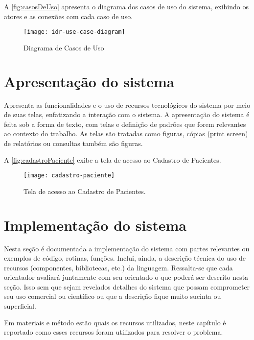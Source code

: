 A \autoref{fig:casosDeUso} apresenta o diagrama dos casos de uso do sistema, exibindo os atores e as conexões com cada caso de uso.

\begin{figure}[htpb]
  \captionsetup{width=0.5\textwidth}
  \caption{Diagrama de Casos de Uso}
  \label{fig:casosDeUso}
  \texttt{[image: idr-use-case-diagram]}
  \fonte{}
\end{figure}

\section{Apresentação do sistema}\label{sec:apresentacaoSistema}

Apresenta as funcionalidades e o uso de recursos tecnológicos do sistema por meio de suas telas, enfatizando a interação com o sistema. A apresentação do sistema é feita sob a forma de texto, com telas e definição de padrões que forem relevantes ao contexto do trabalho. As telas são tratadas como figuras, cópias (print screen) de relatórios ou consultas também são figuras.

A \autoref{fig:cadastroPaciente} exibe a tela de acesso ao Cadastro de Pacientes.

\begin{figure}[htpb]%
  \captionsetup{width=0.43\textwidth}
  \caption{Tela de acesso ao Cadastro de Pacientes.}%
  \label{fig:cadastroPaciente}%
  \texttt{[image: cadastro-paciente]}%
  \fonte{}%
\end{figure}

\section{Implementação do sistema}\label{sec:implementacaoSistema}

Nesta seção é documentada a implementação do sistema com partes relevantes ou exemplos de código, rotinas, funções. Inclui, ainda, a descrição técnica do uso de recursos (componentes, bibliotecas, etc.) da linguagem. Ressalta-se que cada orientador avaliará juntamente com seu orientado o que poderá ser descrito nesta seção. Isso sem que sejam revelados detalhes do sistema que possam comprometer seu uso comercial ou científico ou que a descrição fique muito sucinta ou superficial.

Em materiais e método estão quais os recursos utilizados, neste capítulo é reportado como esses recursos foram utilizados para resolver o problema.

